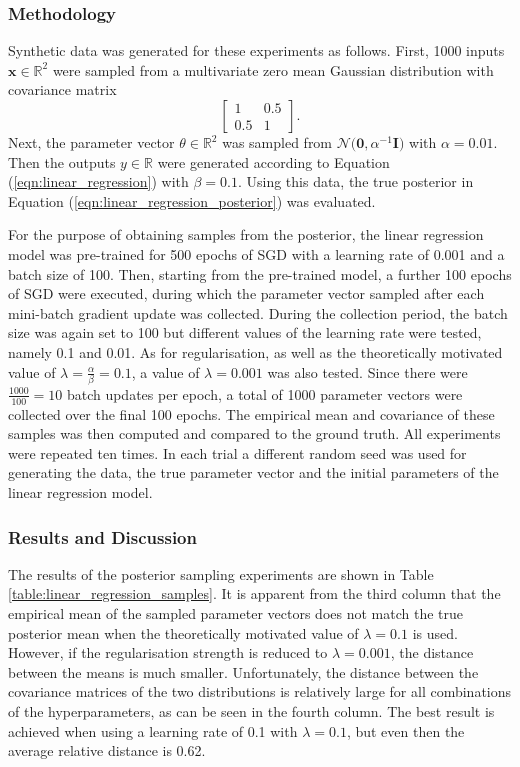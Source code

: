 \documentclass[msc,deptreport.inf]{infthesis} %
\newcommand{\matr}[1]{\mathbf{#1}}
\newcommand{\R}{\mathbb R}
\begin{document}
\subsubsection{Methodology}

Synthetic data was generated for these experiments as follows. First, 1000 inputs $\matr{x} \in \R^2$ were sampled from a multivariate zero mean Gaussian distribution with covariance matrix
\begin{equation}
	\begin{bmatrix}
		1 & 0.5 \\
		0.5 & 1
	\end{bmatrix}.
\end{equation}
Next, the parameter vector $\theta \in \R^2$ was sampled from $\mathcal{N}\big(\matr{0}, \alpha^{-1} \matr{I} \big)$ with $\alpha = 0.01$. Then the outputs $y \in \R$ were generated according to Equation (\ref{eqn:linear_regression}) with $\beta = 0.1$. Using this data, the true posterior in Equation (\ref{eqn:linear_regression_posterior}) was evaluated. 

For the purpose of obtaining samples from the posterior, the linear regression model was pre-trained for 500 epochs of SGD with a learning rate of 0.001 and a batch size of 100. Then, starting from the pre-trained model, a further 100 epochs of SGD were executed, during which the parameter vector sampled after each mini-batch gradient update was collected. During the collection period, the batch size was again set to 100 but different values of the learning rate were tested, namely 0.1 and 0.01. As for regularisation, as well as the theoretically motivated value of $\lambda = \frac{\alpha}{\beta} = 0.1$, a value of $\lambda = 0.001$ was also tested. Since there were $\frac{1000}{100} = 10$ batch updates per epoch, a total of 1000 parameter vectors were collected over the final 100 epochs. The empirical mean and covariance of these samples was then computed and compared to the ground truth. All experiments were repeated ten times. In each trial a different random seed was used for generating the data, the true parameter vector and the initial parameters of the linear regression model. 

\subsubsection{Results and Discussion}

The results of the posterior sampling experiments are shown in Table \ref{table:linear_regression_samples}. It is apparent from the third column that the empirical mean of the sampled parameter vectors does not match the true posterior mean when the theoretically motivated value of $\lambda = 0.1$ is used. However, if the regularisation strength is reduced to $\lambda = 0.001$, the distance between the means is much smaller. Unfortunately, the distance between the covariance matrices of the two distributions is relatively large for all combinations of the hyperparameters, as can be seen in the fourth column. The best result is achieved when using a learning rate of 0.1 with $\lambda = 0.1$, but even then the average relative distance is 0.62. 
\end{document}
